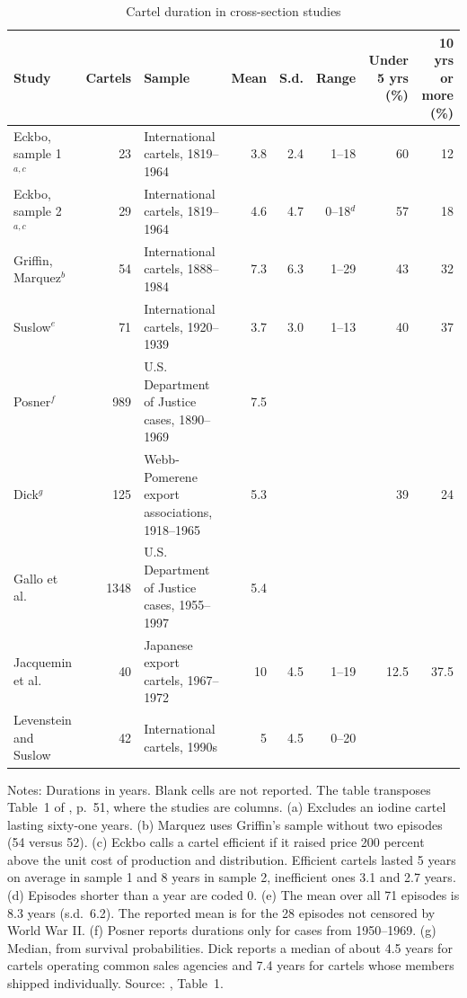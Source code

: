 \begin{table}[!tb]
\centering
\caption{Cartel duration in cross-section studies}\label{tab:12-ls-duration}
\footnotesize
\begin{tabular}{@{}l r >{\raggedright\arraybackslash}p{3.8cm} r r r r r@{}}
\toprule
Study & Cartels & Sample & Mean & S.d. & Range & \makecell[r]{Under\\5 yrs (\%)} & \makecell[r]{10 yrs or\\more (\%)}\\
\midrule
Eckbo, sample 1$^{a,c}$ & 23 & International cartels, 1819--1964 & 3.8 & 2.4 & 1--18 & 60 & 12\\
Eckbo, sample 2$^{a,c}$ & 29 & International cartels, 1819--1964 & 4.6 & 4.7 & 0--18$^{d}$ & 57 & 18\\
Griffin, Marquez$^{b}$ & 54 & International cartels, 1888--1984 & 7.3 & 6.3 & 1--29 & 43 & 32\\
Suslow$^{e}$ & 71 & International cartels, 1920--1939 & 3.7 & 3.0 & 1--13 & 40 & 37\\
Posner$^{f}$ & 989 & U.S. Department of Justice cases, 1890--1969 & 7.5 & & & & \\
Dick$^{g}$ & 125 & Webb-Pomerene export associations, 1918--1965 & 5.3 & & & 39 & 24\\
Gallo et al. & 1348 & U.S. Department of Justice cases, 1955--1997 & 5.4 & & & & \\
Jacquemin et al. & 40 & Japanese export cartels, 1967--1972 & 10 & 4.5 & 1--19 & 12.5 & 37.5\\
Levenstein and Suslow & 42 & International cartels, 1990s & 5 & 4.5 & 0--20 & & \\
\bottomrule
\end{tabular}

\smallskip
\begin{minipage}{\textwidth}\footnotesize
Notes: Durations in years. Blank cells are not reported. The table transposes Table~1 of
\citet{LevensteinSuslow2006}, p.~51, where the studies are columns. (a) Excludes an iodine cartel lasting
sixty-one years. (b) Marquez uses Griffin's sample without two episodes (54 versus 52). (c) Eckbo calls a cartel
efficient if it raised price 200 percent above the unit cost of production and distribution. Efficient cartels lasted
5 years on average in sample 1 and 8 years in sample 2, inefficient ones 3.1 and 2.7 years. (d) Episodes shorter than
a year are coded 0. (e) The mean over all 71 episodes is 8.3 years (s.d.\ 6.2). The reported mean is for the 28
episodes not censored by World War II. (f) Posner reports durations only for cases from 1950--1969. (g) Median, from
survival probabilities. Dick reports a median of about 4.5 years for cartels operating common sales agencies and 7.4
years for cartels whose members shipped individually.
Source: \citet{LevensteinSuslow2006}, Table~1.
\end{minipage}
\end{table}

